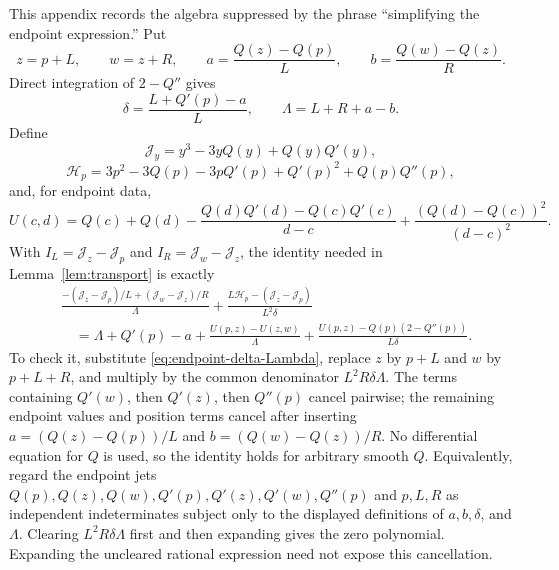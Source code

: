 \documentclass[11pt]{article}
\theoremstyle{remark}
\numberwithin{equation}{section}
\begin{document}
This appendix records the algebra suppressed by the phrase ``simplifying the
endpoint expression.'' Put
\[
 z=p+L,\qquad w=z+R,\qquad
 a=\frac{Q(z)-Q(p)}L,\qquad b=\frac{Q(w)-Q(z)}R.
\]
Direct integration of \(2-Q''\) gives
\begin{equation}\label{eq:endpoint-delta-Lambda}
 \delta=\frac{L+Q'(p)-a}{L},\qquad
 \Lambda=L+R+a-b.
\end{equation}
Define
\[
 \mathcal J_y=y^3-3yQ(y)+Q(y)Q'(y),
\]
\[
 \mathcal H_p=3p^2-3Q(p)-3pQ'(p)+Q'(p)^2+Q(p)Q''(p),
\]
and, for endpoint data,
\[
 U(c,d)=Q(c)+Q(d)-\frac{Q(d)Q'(d)-Q(c)Q'(c)}{d-c}
 +\frac{(Q(d)-Q(c))^2}{(d-c)^2}.
\]
With \(I_L=\mathcal J_z-\mathcal J_p\) and
\(I_R=\mathcal J_w-\mathcal J_z\), the identity needed in
Lemma~\ref{lem:transport} is exactly
\begin{align*}
&\frac{-(\mathcal J_z-\mathcal J_p)/L
 +(\mathcal J_w-\mathcal J_z)/R}{\Lambda}
 +\frac{L\mathcal H_p-(\mathcal J_z-\mathcal J_p)}{L^2\delta}\\
&\quad=\Lambda+Q'(p)-a
 +\frac{U(p,z)-U(z,w)}{\Lambda}
 +\frac{U(p,z)-Q(p)(2-Q''(p))}{L\delta}.
\end{align*}
To check it, substitute \eqref{eq:endpoint-delta-Lambda}, replace
\(z\) by \(p+L\) and \(w\) by \(p+L+R\), and multiply by the common
denominator \(L^2R\delta\Lambda\). The terms containing \(Q'(w)\), then
\(Q'(z)\), then \(Q''(p)\) cancel pairwise; the remaining endpoint values and
position terms cancel after inserting \(a=(Q(z)-Q(p))/L\) and
\(b=(Q(w)-Q(z))/R\). No differential equation for \(Q\) is used, so the
identity holds for arbitrary smooth \(Q\).
Equivalently, regard the endpoint jets
\(Q(p),Q(z),Q(w),Q'(p),Q'(z),Q'(w),Q''(p)\) and \(p,L,R\) as independent
indeterminates subject only to the displayed definitions of \(a,b,\delta\),
and \(\Lambda\). Clearing \(L^2R\delta\Lambda\) first and then expanding gives
the zero polynomial. Expanding the uncleared rational expression need not
expose this cancellation.
\end{document}
